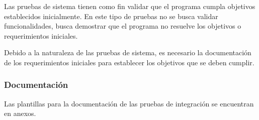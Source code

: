 Las pruebas de sistema tienen como fin validar que el programa cumpla objetivos establecidos inicialmente. En este tipo de pruebas no se busca validar funcionalidades, busca demostrar que el programa no resuelve los objetivos o requerimientos iniciales.

Debido a la naturaleza de las pruebas de sistema, es necesario la documentación de los requerimientos iniciales para establecer los objetivos que se deben cumplir.

\subsubsection{Documentación}

Las plantillas para la documentación de las pruebas de integración se encuentran en anexos.
